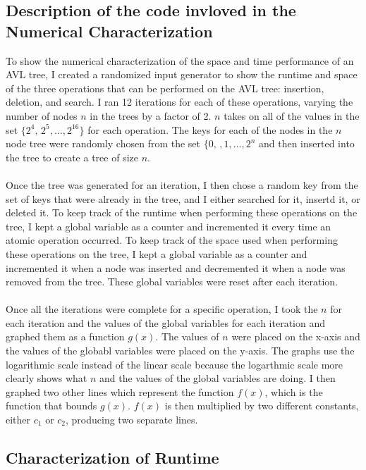 \documentclass[12pt]{article}
\begin{document}
\subsection*{Description of the code invloved in the Numerical Characterization}
To show the numerical characterization of the space and time performance of an
AVL tree, I created a randomized input generator to show the runtime and space
of the three operations that can be performed on the AVL tree: insertion,
deletion, and search.  I ran 12 iterations for each of these operations, varying
the number of nodes $n$ in the trees by a factor of 2.  $n$ takes on all of
the values in the set $\{2^4,\,2^5,\ldots,2^{16}\}$ for each operation.  The
keys for each of the nodes in the $n$ node tree were randomly chosen from the
set $\{0,\,,1,\ldots,2^n$ and then inserted into the tree to create a tree of
size $n$.\\
\\
Once the tree was generated for an iteration, I then chose a random key
from the set of keys that were already in the tree, and I either searched for
it, insertd it, or deleted it.  To keep track of the runtime when performing
these operations on the tree, I kept a global variable as a counter and
incremented it every time an atomic operation occurred.  To keep track of the space used when
performing these operations on the tree, I kept a global variable as a counter
and incremented it when a node was inserted and decremented it when a node was
removed from the tree.  These global variables were reset after each
iteration.\\
\\
Once all the iterations were complete for a specific operation, I took the $n$
for each iteration and the values of the global variables for each iteration and
graphed them as a function $g(x)$.  The values of $n$ were placed on the
x-axis and the values of the globabl variables were placed on the y-axis.  The graphs use the logarithmic
scale instead of the linear scale because the logarthmic scale more clearly
shows what $n$ and the values of the global variables are doing.
I then graphed two other lines which represent the function $f(x)$, which is the
function that bounds $g(x)$. $f(x)$ is then
multiplied by two different constants, either $c_1$ or $c_2$, producing two
separate lines.
\subsection*{Characterization of Runtime}
\end{document}
